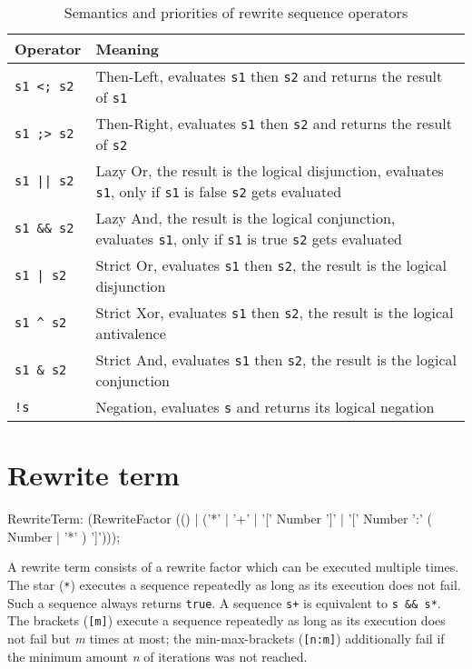 \begin{table}[htbp]
    \begin{tabularx}{\linewidth}{l|X}
        \bf Operator & \bf Meaning \\\hline\hline
        \verb/s1 <; s2/ & Then-Left, evaluates \texttt{s1} then \texttt{s2} and returns the result of \texttt{s1}\\
		\verb/s1 ;> s2/ & Then-Right, evaluates \texttt{s1} then \texttt{s2} and returns the result of \texttt{s2}\\\hline
        \verb/s1 || s2/ & Lazy Or, the result is the logical disjunction, evaluates \texttt{s1}, only if \texttt{s1} is false \texttt{s2} gets evaluated\\\hline
        \verb/s1 && s2/ & Lazy And, the result is the logical conjunction, evaluates \texttt{s1}, only if \texttt{s1} is true \texttt{s2} gets evaluated\\\hline
        \verb/s1 | s2/ & Strict Or, evaluates \texttt{s1} then \texttt{s2}, the result is the logical disjunction\\\hline
        \verb/s1 ^ s2/ & Strict Xor, evaluates \texttt{s1} then \texttt{s2}, the result is the logical antivalence\\\hline
        \verb/s1 & s2/ & Strict And, evaluates \texttt{s1} then \texttt{s2}, the result is the logical conjunction\\\hline
        \verb/!s/ & Negation, evaluates \texttt{s} and returns its logical negation\\\hline
	\end{tabularx}    
    \caption{Semantics and priorities of rewrite sequence operators}
    \label{tbl:sequ:op}
\end{table}

\section{Rewrite term}

\begin{rail}
  RewriteTerm: 
    (RewriteFactor (() | ('*' | '+' | '[' Number ']' | '[' Number ':' ( Number | '*' ) ']')));
\end{rail}

A rewrite term consists of a rewrite factor which can be executed multiple times.
The star (\texttt{*}) executes a sequence repeatedly as long as its execution does not fail. 
Such a sequence always returns \texttt{true}.
A sequence \verb#s+# is equivalent to \verb#s && s*#.
The brackets (\texttt{[m]}) execute a sequence repeatedly as long as its execution does not fail but \emph{m} times at most;
the min-max-brackets (\texttt{[n:m]}) additionally fail if the minimum amount \emph{n} of iterations was not reached.

